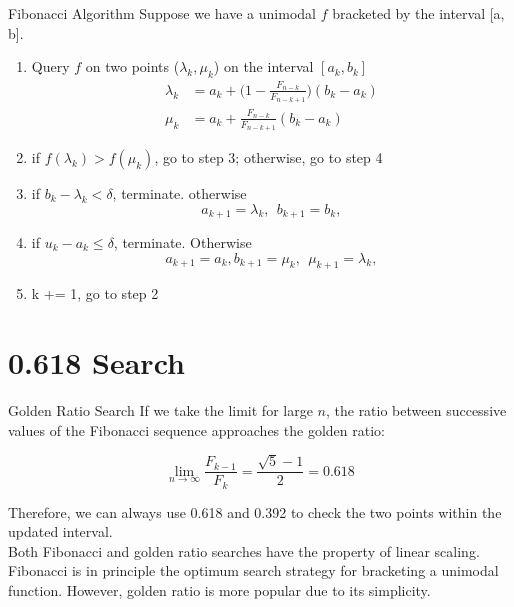 \documentclass{beamer}
\begin{document}

\begin{frame}{Fibonacci Algorithm}
Suppose we have a unimodal $f$ bracketed by the interval [a, b].
\begin{enumerate}
    \item Query $f$ on two points ($\lambda_k, \mu_k$) on the interval $[a_k, b_k]$
    \begin{equation*}
    \begin{split}
        \lambda_k &= a_k + \bigg(1-\frac{F_{n-k}}{F_{n-k+1}}\bigg)(b_k - a_k)\\
        \mu_k &= a_k + \frac{F_{n-k}}{F_{n-k+1}}(b_k - a_k)        
    \end{split}
    \end{equation*}
    \item if $f(\lambda_k) > f(\mu_k)$, go to step 3; otherwise, go to step 4
    \item if $b_k - \lambda_k < \delta$, terminate. otherwise
    \begin{equation*}
        a_{k+1} = \lambda_k, ~~ b_{k+1} = b_k, 
    \end{equation*}
    \item if $u_k - a_k \leq \delta$, terminate. Otherwise
    \begin{equation*}
        a_{k+1} = a_k, b_{k+1} = \mu_k, ~~ \mu_{k+1} = \lambda_k, 
    \end{equation*}
    \item k += 1, go to step 2
\end{enumerate}
\end{frame}

\section{0.618 Search}

\begin{frame}{Golden Ratio Search}
If we take the limit for large $n$, the ratio between successive values of the Fibonacci sequence approaches the golden ratio:

\begin{equation*}
\lim_{n\rightarrow\infty} \frac{F_{k-1}}{F_k} = \frac{\sqrt{5}-1}{2} = 0.618
\end{equation*}

Therefore, we can always use 0.618 and 0.392 to check the two points within the updated interval.\\

Both Fibonacci and golden ratio searches have the property of linear scaling. Fibonacci is in principle the optimum search strategy for bracketing a unimodal function. However, golden ratio is more popular due to its simplicity.

\end{frame}
\end{document}

